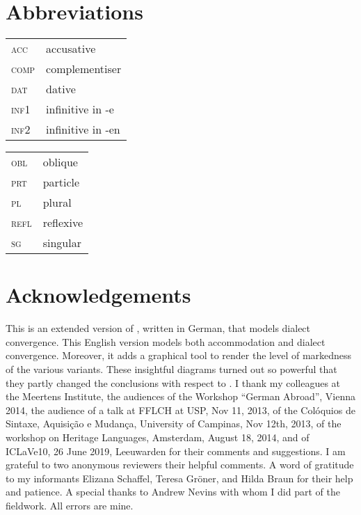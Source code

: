\documentclass[output=paper,hidelinks,draftmode]{langscibook}
\begin{document}
\section*{Abbreviations}
\begin{tabularx}{.45\textwidth}{lQ}
    \textsc{acc} & accusative\\
    \textsc{comp} & complementiser\\
    \textsc{dat} & dative\\
    \textsc{inf1} & infinitive in -e\\
    \textsc{inf2} & infinitive in -en\\
\end{tabularx}
\begin{tabularx}{.45\textwidth}{lQ}
    \textsc{obl} & oblique\\
    \textsc{prt} & particle\\
    \textsc{pl} & plural\\
    \textsc{refl} & reflexive\\
    \textsc{sg} & singular\\
\end{tabularx}

\section*{Acknowledgements}

This is an extended version of \citet{Postma2016}, written in German, that models dialect convergence. This English version models both accommodation and dialect convergence. Moreover, it adds a graphical tool to render the level of markedness of the various variants. These insightful diagrams turned out so powerful that they partly changed the conclusions with respect to \citet{Postma2016}. I thank my colleagues at the Meertens Institute, the audiences of the Workshop ``German Abroad'', Vienna 2014, the audience of a talk at FFLCH at USP, Nov 11, 2013, of the Colóquios de Sintaxe, Aquisição e Mudança, University of Campinas, Nov 12th, 2013, of the workshop on Heritage Languages, Amsterdam, August 18, 2014, and of ICLaVe10, 26 June 2019, Leeuwarden for their comments and suggestions. I am grateful to two anonymous reviewers their helpful comments. A word of gratitude to my informants Elizana Schaffel, Teresa Gröner, and Hilda Braun for their help and patience. A special thanks to Andrew Nevins with whom I did part of the fieldwork. All errors are mine.

\sloppy
\printbibliography[heading=subbibliography,notkeyword=this]
\end{document}
